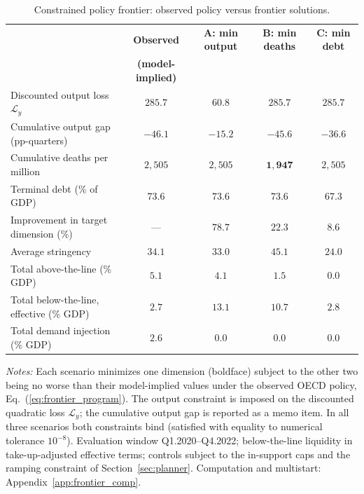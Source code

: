 \documentclass[12pt, a4paper]{article}
\begin{document}
\begin{table}[H]
\centering
\scriptsize
\caption{Constrained policy frontier: observed policy versus frontier solutions.}
\label{tab:frontier}
\begin{tabular}{lcccc}
\toprule
 & \textbf{Observed} & \textbf{A: min output} & \textbf{B: min deaths} & \textbf{C: min debt} \\
 & \textbf{(model-implied)} & & & \\
\midrule
Discounted output loss \(\mathcal{L}_y\) & $285.7$ & $\mathbf{60.8}$ & $285.7$ & $285.7$ \\
Cumulative output gap (pp-quarters)      & $-46.1$ & $-15.2$ & $-45.6$ & $-36.6$ \\
Cumulative deaths per million            & $2{,}505$ & $2{,}505$ & $\mathbf{1{,}947}$ & $2{,}505$ \\
Terminal debt (\% of GDP)                & $73.6$ & $73.6$ & $73.6$ & $\mathbf{67.3}$ \\
Improvement in target dimension (\%)     & --- & $78.7$ & $22.3$ & $8.6$ \\
\midrule
Average stringency                       & $34.1$ & $33.0$ & $45.1$ & $24.0$ \\
Total above-the-line (\% GDP)            & $5.1$ & $4.1$ & $1.5$ & $0.0$ \\
Total below-the-line, effective (\% GDP) & $2.7$ & $13.1$ & $10.7$ & $2.8$ \\
Total demand injection (\% GDP)          & $2.6$ & $0.0$ & $0.0$ & $0.0$ \\
\bottomrule
\end{tabular}
\vspace{0.15cm}
\begin{minipage}{0.95\textwidth}
\scriptsize \textit{Notes:} Each scenario minimizes one dimension (boldface)
subject to the other two being no worse than their model-implied values under
the observed OECD policy, Eq.~(\ref{eq:frontier_program}). The output
constraint is imposed on the discounted quadratic loss \(\mathcal{L}_y\); the
cumulative output gap is reported as a memo item. In all three scenarios both
constraints bind (satisfied with equality to numerical tolerance
\(10^{-8}\)). Evaluation window Q1.2020--Q4.2022; below-the-line liquidity in
take-up-adjusted effective terms; controls subject to the in-support caps and
the ramping constraint of Section~\ref{sec:planner}. Computation and
multistart: Appendix~\ref{app:frontier_comp}.
\end{minipage}
\end{table}
\end{document}
